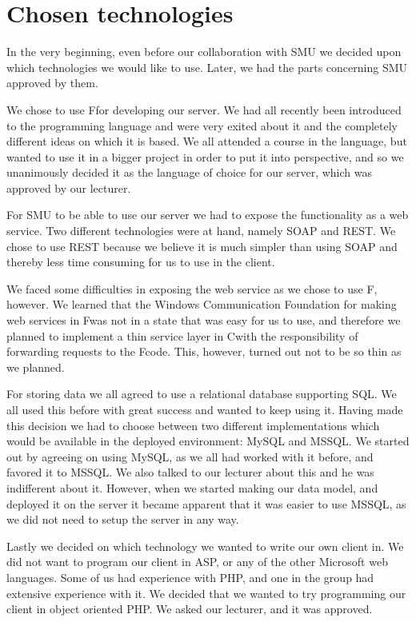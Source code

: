 \section{Chosen technologies}
In the very beginning, even before our collaboration with SMU we decided upon which technologies we would like to use. Later, we had the parts concerning SMU approved by them.

We chose to use F\Sh for developing our server. We had all recently been introduced to the programming language and were very exited about it and the completely different ideas on which it is based. We all attended a course in the language, but wanted to use it in a bigger project in order to put it into perspective, and so we unanimously decided it as the language of choice for our server, which was approved by our lecturer.

For SMU to be able to use our server we had to expose the functionality as a web service. Two different technologies were at hand, namely SOAP and REST. We chose to use REST because we believe it is much simpler than using SOAP and thereby less time consuming for us to use in the client.

We faced some difficulties in exposing the web service as we chose to use F\Sh, however. We learned that the Windows Communication Foundation for making web services in F\Sh was not in a state that was easy for us to use, and therefore we planned to implement a thin service layer in C\Sh with the responsibility of forwarding requests to the F\Sh code. This, however, turned out not to be so thin as we planned.

For storing data we all agreed to use a relational database supporting SQL. We all used this before with great success and wanted to keep using it.
Having made this decision we had to choose between two different implementations which would be available in the deployed environment: MySQL and MSSQL. We started out by agreeing on using MySQL, as we all had worked with it before, and favored it to MSSQL. We also talked to our lecturer about this and he was indifferent about it. However, when we started making our data model, and deployed it on the server it became apparent that it was easier to use MSSQL, as we did not need to setup the server in any way.

Lastly we decided on which technology we wanted to write our own client in. We did not want to program our client in ASP, or any of the other Microsoft web languages. Some of us had experience with PHP, and one in the group had extensive experience with it. We decided that we wanted to try programming our client in object oriented PHP. We asked our lecturer, and it was approved.
\newpage